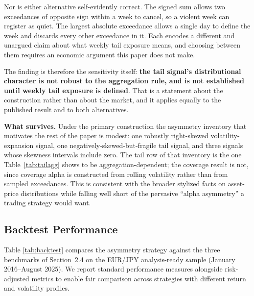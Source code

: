 \documentclass[11pt]{article}
\begin{document}
Nor is either alternative self-evidently correct. The signed sum allows two exceedances of opposite sign within a week to cancel, so a violent week can register as quiet. The largest absolute exceedance allows a single day to define the week and discards every other exceedance in it. Each encodes a different and unargued claim about what weekly tail exposure means, and choosing between them requires an economic argument this paper does not make.

The finding is therefore the sensitivity itself: \textbf{the tail signal's distributional character is not robust to the aggregation rule, and is not established until weekly tail exposure is defined}. That is a statement about the construction rather than about the market, and it applies equally to the published result and to both alternatives.

\textbf{What survives.} Under the primary construction the asymmetry inventory that motivates the rest of the paper is modest: one robustly right-skewed volatility-expansion signal, one negatively-skewed-but-fragile tail signal, and three signals whose skewness intervals include zero. The tail row of that inventory is the one Table~\ref{tab:tailagg} shows to be aggregation-dependent; the coverage result is not, since coverage alpha is constructed from rolling volatility rather than from sampled exceedances. This is consistent with the broader stylized facts on asset-price distributions \citep{cont2001empirical, mandelbrot1963variation} while falling well short of the pervasive ``alpha asymmetry'' a trading strategy would want.

\subsection{Backtest Performance}

Table \ref{tab:backtest} compares the asymmetry strategy against the three benchmarks of Section~2.4 on the EUR/JPY analysis-ready sample (January 2016--August 2025). We report standard performance measures alongside risk-adjusted metrics to enable fair comparison across strategies with different return and volatility profiles.
\end{document}
